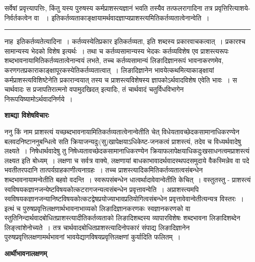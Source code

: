 \documentclass[11pt, openany]{book}
\begin{document}
सर्वेषां प्रवृत्त्यापत्तिः, किंतु यस्य पुरुषस्य कर्मप्राशस्त्यज्ञानं भवति तस्यैव तत्फलरागादिना तत्र प्रवृत्तिरित्याशये-
\newpage
\lfoot{}
\fancyhead[RE]{[शाब्द्या विशेषविचारः]}
{\bl निर्वर्तकत्वेन वा~ । इतिकर्तव्यताकाङ्क्षायामर्थवादज्ञाप्यप्राशस्त्यमितिकर्तव्यतात्वेनान्वेति~।}\\
\hrule
\vspace{3mm}
\noindent
नाह\textendash\ {\br इतिकर्तव्यतेत्यादिना~।} कर्तव्यस्येतिप्रकार इतिकर्तव्यता, {\qt इति} शब्दस्य प्रकारवाचकत्वात्~। प्रकारश्च सामान्यस्य भेदको विशेष इत्यर्थः~।
तथा च कर्तव्यसामान्यस्य भेदकः कर्तव्यविशेष एव प्राशस्त्यरूपः शब्दभावनायामितिकर्तव्यतात्वेनान्वयं लभते, तच्च कर्तव्यसामान्यं लिङादिज्ञानरूपं भावनाकरणमेव,
करणगतप्रकाराकाङ्क्षापूरकस्येतिकर्तव्यतात्वात्~। लिङादिज्ञानेन भावयेत्कथमित्याकाङ्क्षायां कर्मप्राशस्त्यविशिष्टेनेति प्रकारान्वयात् तस्य च प्राशस्त्यविशेषस्य ज्ञापकोऽर्थवादविशेष एवेति भावः~। स चार्थवादः {\qt स प्रजापतिरात्मनो वपामुदखिदत्} इत्यादिः, तं चार्थवादं चतुर्विधविभागेन निरूपयिष्यामोऽर्थवादनिर्णये~।
\begin{center}
 \textbf{शाब्द्या विशेषविचारः}
\end{center}

{\br ननु} किं नाम प्राशस्त्यं यच्छब्दभावनायामितिकर्तव्यतात्वेनान्वेतीति चेत् विधेयतावच्छेदकसामानाधिकरण्येन बलवदनिष्टाननुबन्धित्वे सति क्रियाजन्यदुः(सु)खापेक्षयाऽधिकेष्ट-जनकत्वं प्राशस्त्यं, तदेव च विध्यर्थवादेषु लक्ष्यते~। निषेधार्थवादेषु तु निषेध्यतावच्छेदकसामानाधिकरण्येन क्रियाफलापेक्षयाधिकदुःखसाधनत्वमप्राशस्त्यं लक्ष्यत इति बोध्यम्~। लक्षणा च सर्वत्र वाक्ये, लक्षणायां बाधकाभावादर्थवादस्थपदसमुदाये वैकस्मिन्नेव वा पदे भवतीतरपदानि तात्पर्यग्राहकाणीत्यनाग्रहः~। तच्च प्राशस्त्यादिकमितिकर्तव्यतात्वसंबन्धेन शब्दभावनायामन्वेतीति बहवो वदन्ति~। स्वरूपसंबन्धेन धात्वर्थादावेवान्वेतीति केचित्~।
वस्तुतस्तु - प्राशस्त्यं स्वविषयकज्ञानजन्येष्टविषयकोत्कटरागजन्यत्वसंबन्धेन प्रवृत्तावन्वेति~। अप्राशस्त्यमपि स्वविषयकज्ञानजन्यानिष्टविषयकोत्कटद्वेषप्रयोज्याभावप्रतियोगित्वसंबन्धेन प्रवृत्तावेवान्वेतीत्यन्यत्र विस्तरः~। इत्थं च पुरुषप्रवृत्तिलक्षणार्थभावनाभाव्यको लिङादिज्ञानकरणकः स्वज्ञानकरणको वा स्तुतिनिन्दार्थवादबोधितप्राशस्त्यादीतिकर्तव्यताको लिङादिशब्दस्य व्यापारविशेषः शब्दभावना लिङादिशब्देन लिङ्त्वांशेनोच्यते~। तत्र
चार्थवादबोधितप्राशस्त्यादिनोपकारं संपाद्य लिङादिज्ञानेन पुरुषप्रवृत्तिलक्षणामर्थभावनां भावयेद्यागविषयप्रवृत्तिलक्षणां कुर्यादिति फलितम्~।
\newpage
\fancyhead[LO]{[आर्थीभावनालक्षणम् ]}
\begin{center}
\textbf{आर्थीभावनालक्षणम्}    
\end{center}
\end{document}
